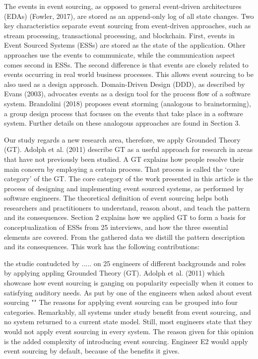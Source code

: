 The events in event sourcing, as opposed to general event-driven architectures (EDAs) (Fowler, 2017), are stored as an append-only log of all state changes. Two key characteristics separate event sourcing from event-driven approaches, such as stream processing, transactional processing, and blockchain. First, events in Event Sourced Systems (ESSs) are stored as the state of the application. Other approaches use the events to communicate, while the communication aspect comes second in ESSs. The second difference is that events are closely related to events occurring in real world business processes. This allows event sourcing to be also used as a design approach. Domain-Driven Design (DDD), as described by Evans (2003), advocates events as a design tool for the process flow of a software system. Brandolini (2018) proposes event storming (analogous to brainstorming), a group design process that focuses on the events that take place in a software system. Further details on these analogous approaches are found in Section 3.


Our study regards a new research area, therefore, we apply Grounded Theory (GT). Adolph et al. (2011) describe GT as a useful approach for research in areas that have not previously been studied. A GT explains how people resolve their main concern by employing a certain process. That process is called the ‘core category’ of the GT. The core category of the work presented in this article is the process of designing and implementing event sourced systems, as performed by software engineers. The theoretical definition of event sourcing helps both researchers and practitioners to understand, reason about, and teach the pattern and its consequences. Section 2 explains how we applied GT to form a basis for conceptualization of ESSs from 25 interviews, and how the three essential elements are covered. From the gathered data we distill the pattern description and its consequences. This work has the following contributions:


the studie contudcted by ..... on 25 engineers of different backgrounds and roles by applying appling Grounded Theory (GT). Adolph et al. (2011) which showcase how event sourcing is ganging on popularity especially when it comes to satisfying auditory needs. As put by one of the engineers when asked about event sourcing ""
The reasons for applying event sourcing can be grouped into four categories. Remarkably, all systems under study benefit from event sourcing, and no system returned to a current state model. Still, most engineers state that they would not apply event sourcing in every system. The reason given for this opinion is the added complexity of introducing event sourcing. Engineer E2 would apply event sourcing by default, because of the benefits it gives.~\cite{OVEREEM2021110970}


